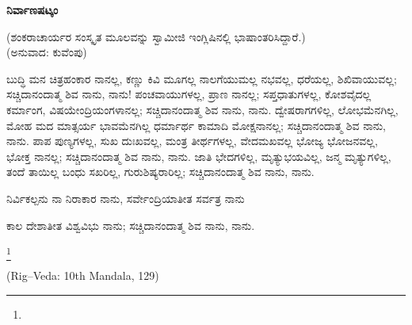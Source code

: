 \begin{center}
\textbf{ನಿರ್ವಾಣಷಟ್ಕಂ}
\end{center}

\begin{center}
(ಶಂಕರಾಚಾರ್ಯರ ಸಂಸ್ಕೃತ ಮೂಲವನ್ನು ಸ್ವಾಮೀಜಿ ಇಂಗ್ಲಿಷಿನಲ್ಲಿ ಭಾಷಾಂತರಿಸಿದ್ದಾರೆ.)\\(ಅನುವಾದ: ಕುವೆಂಪು)
\end{center}

ಬುದ್ಧಿ ಮನ ಚಿತ್ರಹಂಕಾರ ನಾನಲ್ಲ, ಕಣ್ಣು ಕಿವಿ ಮೂಗಲ್ಲ ನಾಲಗೆಯುಮಲ್ಲ ನಭವಲ್ಲ, ಧರೆಯಲ್ಲ, ಶಿಖಿವಾಯುವಲ್ಲ; ಸಚ್ಚಿದಾನಂದಾತ್ಮ ಶಿವ ನಾನು, ನಾನು! ಪಂಚವಾಯುಗಳಲ್ಲ, ಪ್ರಾಣ ನಾನಲ್ಲ; ಸಪ್ತಧಾತುಗಳಲ್ಲ, ಕೋಶವೈದಲ್ಲ ಕರ್ಮಾಂಗ, ವಿಷಯೇಂದ್ರಿಯಂಗಳಾನಲ್ಲ; ಸಚ್ಚಿದಾನಂದಾತ್ಮ ಶಿವ ನಾನು, ನಾನು. ದ್ವೇಷರಾಗಗಳಿಲ್ಲ, ಲೋಭಮೆನಗಿಲ್ಲ, ಮೋಹ ಮದ ಮಾತ್ಸರ್ಯ ಭಾವಮೆನಗಿಲ್ಲ ಧರ್ಮಾರ್ಥ ಕಾಮಾದಿ ಮೋಕ್ಷನಾನಲ್ಲ; ಸಚ್ಚಿದಾನಂದಾತ್ಮ ಶಿವ ನಾನು, ನಾನು. ಪಾಪ ಪುಣ್ಯಗಳಲ್ಲ, ಸುಖ ದುಃಖವಲ್ಲ, ಮಂತ್ರ ತೀರ್ಥಗಳಲ್ಲ, ವೇದಮಖವಲ್ಲ ಭೋಜ್ಯ ಭೋಜನವಲ್ಲ, ಭೋಕ್ತ ನಾನಲ್ಲ; ಸಚ್ಚಿದಾನಂದಾತ್ಮ ಶಿವ ನಾನು, ನಾನು. ಜಾತಿ ಭೇದಗಳಿಲ್ಲ, ಮೃತ್ಯುಭಯವಿಲ್ಲ, ಜನ್ಮ ಮೃತ್ಯುಗಳಿಲ್ಲ, ತಂದೆ ತಾಯಿಲ್ಲ ಬಂಧು ಸಖರಿಲ್ಲ, ಗುರುಶಿಷ್ಯರಾರಿಲ್ಲ; ಸಚ್ಚಿದಾನಂದಾತ್ಮ ಶಿವ ನಾನು, ನಾನು.

ನಿರ್ವಿಕಲ್ಪನು ನಾ ನಿರಾಕಾರ ನಾನು, ಸರ್ವೇಂದ್ರಿಯಾತೀತ ಸರ್ವತ್ರ ನಾನು

ಕಾಲ ದೇಶಾತೀತ ವಿಶ್ವವಿಭು ನಾನು; ಸಚ್ಚಿದಾನಂದಾತ್ಮ ಶಿವ ನಾನು, ನಾನು.

\protect\footnote{}

\begin{center}
(Rig–Veda: 10th Mandala, 129)
\end{center}

\begin{myquote}
\end{myquote}

\begin{myquote}
\end{myquote}

\begin{myquote}
\end{myquote}

